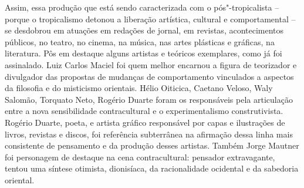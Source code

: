 Assim, essa produção que está sendo caracterizada com o pós"-tropicalista
-- porque o tropicalismo detonou a liberação artística, cultural e
comportamental -- se desdobrou em atuações em redações de jornal, em
revistas, acontecimentos públicos, no teatro, no cinema, na música, nas
artes plásticas e gráficas, na literatura. Pôs em destaque alguns
artistas e teóricos exemplares, como já foi assinalado. Luiz Carlos
Maciel foi quem melhor encarnou a figura de teorizador e divulgador das
propostas de mudanças de comportamento vinculados a aspectos da
filosofia e do misticismo orientais. Hélio Oiticica, Caetano Veloso,
Waly Salomão, Torquato Neto, Rogério Duarte foram os responsáveis pela
articulação entre a nova sensibilidade contracultural e o
experimentalismo construtivista. Rogério Duarte, poeta, e artista
gráfico responsável por capas e ilustrações de livros, revistas e
discos, foi referência subterrânea na afirmação dessa linha mais
consistente de pensamento e da produção desses artistas. Também Jorge
Mautner foi personagem de destaque na cena contracultural: pensador
extravagante, tentou uma síntese otimista, dionisíaca, da racionalidade
ocidental e da sabedoria oriental.

